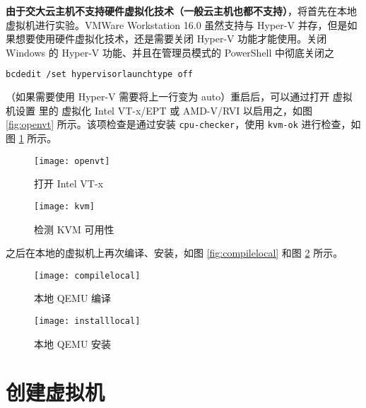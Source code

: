     \textbf{由于交大云主机不支持硬件虚拟化技术（一般云主机也都不支持）}，将首先在本地虚拟机进行实验。VMWare Workstation 16.0 虽然支持与 Hyper-V 并存，但是如果想要使用硬件虚拟化技术，还是需要关闭 Hyper-V 功能才能使用。关闭 Windows 的 Hyper-V 功能、并且在管理员模式的 PowerShell 中彻底关闭之
\begin{lstlisting}[style=commandshell,language=bash]
bcdedit /set hypervisorlaunchtype off
\end{lstlisting}
    （如果需要使用 Hyper-V 需要将上一行变为 auto）重启后，可以通过打开 \textsf{虚拟机设置} 里的 \textsf{虚拟化 Intel VT-x/EPT 或 AMD-V/RVI} 以启用之，如图 \ref{fig:openvt} 所示。该项检查是通过安装 \verb"cpu-checker"，使用 \verb"kvm-ok" 进行检查，如图 \ref{fig:kvm} 所示。

    \begin{figure}[h]
        \centering
        \begin{minipage}{0.48\textwidth}
            \centering
            \texttt{[image: openvt]}
            \caption{打开 Intel VT-x}\label{fig:openvt}
        \end{minipage}
        \begin{minipage}{0.48\textwidth}
            \centering
            \texttt{[image: kvm]}
            \caption{检测 KVM 可用性}\label{fig:kvm}
        \end{minipage}
    \end{figure}

    之后在本地的虚拟机上再次编译、安装，如图 \ref{fig:compilelocal} 和图 \ref{fig:installlocal} 所示。

    \begin{figure}[h]
        \centering
        \begin{minipage}{0.48\textwidth}
            \centering
            \texttt{[image: compilelocal]}
            \caption{本地 QEMU 编译}\label{fig:compilelocal}
        \end{minipage}
        \begin{minipage}{0.48\textwidth}
            \texttt{[image: installlocal]}
            \caption{本地 QEMU 安装}\label{fig:installlocal}
        \end{minipage}
    \end{figure}

    \section{创建虚拟机}
    
